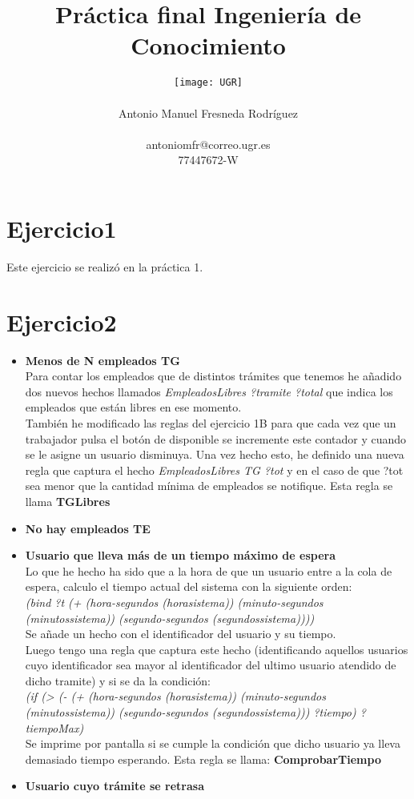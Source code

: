 \documentclass[10pt,spanish]{article}
\author{
	\texttt{[image: UGR]} \\\\
	\Large 	Antonio Manuel Fresneda Rodríguez\\
	\\antoniomfr@correo.ugr.es
	\\77447672-W
	}
\date{}
\title{\huge \textbf{Práctica final Ingeniería de Conocimiento}}
\begin{document}
	\maketitle
	\pagebreak
	\tableofcontents
	\pagebreak
	\section{Ejercicio1}
	Este ejercicio se realizó en la práctica 1. 
	\section{Ejercicio2}
	\begin{itemize}
		\item \textbf{Menos de N empleados TG}\\
		Para contar los empleados que de distintos trámites que tenemos he añadido dos nuevos hechos llamados \textit{EmpleadosLibres ?tramite ?total} que indica los empleados que están libres en ese momento.\\
		También he modificado las reglas del ejercicio 1B para que cada vez que un trabajador pulsa el botón de disponible se incremente este contador y cuando se le asigne un usuario disminuya.
		Una vez hecho esto, he definido una nueva regla que captura el hecho \textit{EmpleadosLibres TG ?tot} y en el caso de que ?tot sea menor que la cantidad mínima de empleados se notifique. Esta regla se llama \textbf{TGLibres}
		\item \textbf{No hay empleados TE}\\
		\item \textbf{Usuario que lleva más de un tiempo 	máximo de espera}\\ Lo que he hecho ha sido que a la hora de que un usuario entre a la cola de espera, calculo el tiempo actual del sistema con la siguiente orden:\\ \textit{(bind ?t (+ (hora-segundos (horasistema)) (minuto-segundos (minutossistema)) (segundo-segundos (segundossistema))))
		}\\
		Se añade un hecho con el identificador del usuario y su tiempo. \\Luego tengo una regla que captura este hecho  (identificando aquellos usuarios cuyo identificador sea mayor al identificador del ultimo usuario atendido de dicho tramite) y si se da la condición:\\ \textit{(if (> (- (+ (hora-segundos (horasistema)) (minuto-segundos (minutossistema)) (segundo-segundos (segundossistema))) ?tiempo) ?tiempoMax)}\\
		Se imprime por pantalla si se cumple la condición que dicho usuario ya lleva demasiado tiempo esperando. Esta regla se llama: \textbf{ComprobarTiempo}
	\item \textbf{Usuario cuyo trámite se retrasa}\\
	\end{itemize}
\end{document}
